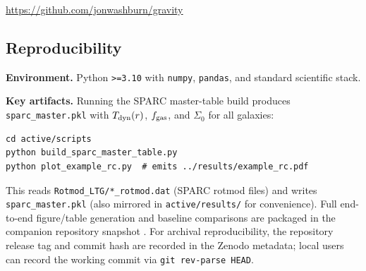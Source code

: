 \documentclass[twocolumn,prd,amsmath,amssymb,aps,superscriptaddress,nofootinbib]{revtex4-2}
\begin{document}
\url{https://github.com/jonwashburn/gravity}

\subsection*{Reproducibility}
\noindent\textbf{Environment.} Python \texttt{>=3.10} with \texttt{numpy}, \texttt{pandas}, and standard scientific stack.

\noindent\textbf{Key artifacts.} Running the SPARC master-table build produces \texttt{sparc\_master.pkl} with $T_{\rm dyn}(r)$, $f_{\rm gas}$, and $\Sigma_0$ for all galaxies:
\begin{verbatim}
cd active/scripts
python build_sparc_master_table.py
python plot_example_rc.py  # emits ../results/example_rc.pdf
\end{verbatim}
This reads \texttt{Rotmod\_LTG/*\_rotmod.dat} (SPARC rotmod files) and writes \texttt{sparc\_master.pkl} (also mirrored in \texttt{active/results/} for convenience). Full end-to-end figure/table generation and baseline comparisons are packaged in the companion repository snapshot \cite{Washburn2025a}. For archival reproducibility, the repository release tag and commit hash are recorded in the Zenodo metadata; local users can record the working commit via \texttt{git rev-parse HEAD}.
\end{document}
